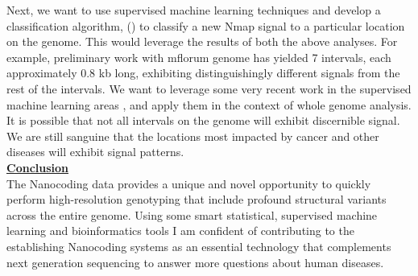 \documentclass[12pt]{extarticle} %
\begin{document}
Next, we want to use supervised machine learning techniques and develop a classification algorithm, (\cite{Muller_2005_ScandJoS}) to classify a new Nmap signal to a particular location on the genome. This would leverage the results of both the above analyses. For example, preliminary work with mflorum genome has yielded 7 intervals, each approximately 0.8 kb long, exhibiting distinguishingly different signals from the rest of the intervals. We want to leverage some very recent work in the supervised machine learning areas \cite{Casado_2010_PhDThesis}, \cite{Alonso_etal_2012_CSDA} and apply them in the context of whole genome analysis. It is possible that not all intervals on the genome will exhibit discernible signal. We are still sanguine that the locations most impacted by cancer and other diseases will exhibit signal patterns.\\
\noindent
{\underline{\bf{Conclusion}}}\\
The Nanocoding data provides a unique and novel opportunity to quickly perform high-resolution genotyping that include profound structural variants across the entire genome.
Using some smart statistical, supervised machine learning and bioinformatics tools I am confident of contributing to the establishing Nanocoding systems as an essential technology that complements next generation sequencing to answer more questions about human diseases.

\newpage

%
\end{document}
